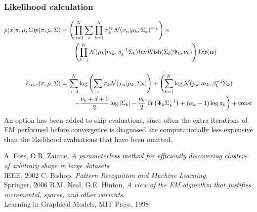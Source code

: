 \documentclass[11pt]{article}
\DeclareMathOperator{\Trace}{Tr}
\def\bs{\boldsymbol}
\begin{document}
\subsubsection{Likelihood calculation}
\begin{align*}
p(x|\pi, \mu, \Sigma)p(\pi, \mu, \Sigma) &= \left( \prod_{n=1}^N \sum_z \prod_{k=1}^K \pi_k^{z_k} \mathcal{N}(x_n|\mu_k, \Sigma_k)^{z_{nk}}\right) \times\\
&\qquad \left(\prod_{k=1}^K \mathcal{N}(\mu_k|m_k, \beta_k^{-1} \Sigma_k)\text{InvWish}(\Sigma_k|\Psi_k, \nu_k)\right)  \text{Dir}(\bs{\alpha})\\[15pt]
\ell_{\text{\tiny{MAP}}}(\pi, \mu, \Sigma) & = \sum_{n=1}^N \log\left(\sum_z \pi_k \mathcal{N}(x_n|\mu_k, \Sigma_k)\right) + \left( \sum_{k=1}^K \log\mathcal{N}(\mu_k|m_k, \beta_k^{-1} \Sigma_k)\right.\\
& \qquad \left. -\frac{\nu_k + d+ 1}{2}\log|\Sigma_k| - \frac{\nu_k}{2}\Trace\left(\Psi_k\Sigma_k^{-1}\right) + (\alpha_k-1)\log\pi_k  \right) + \text{const}
\end{align*}
An option has been added to skip evaluations, since often the extra iterations of EM performed before convergence is diagnosed are computationally less expensive than the likelihood evaluations that have been omitted.
\begin{thebibliography}{1}
{A. Foss, O.R. Zaiane,
\emph{A parameterless method for efficiently discovering clusters of arbitrary shape in large datasets}.\\
IEEE, 2002}
 {C. Bishop,
  \emph{Pattern Recognition and Machine Learning}.\\
  Springer, 2006}
 {R.M. Neal, G.E. Hinton,
  \emph{A view of the EM algorithm that justifies incremental, sparse, and other variants}.\\
  Learning in Graphical Models, MIT Press, 1998}
\end{thebibliography}
\end{document}
